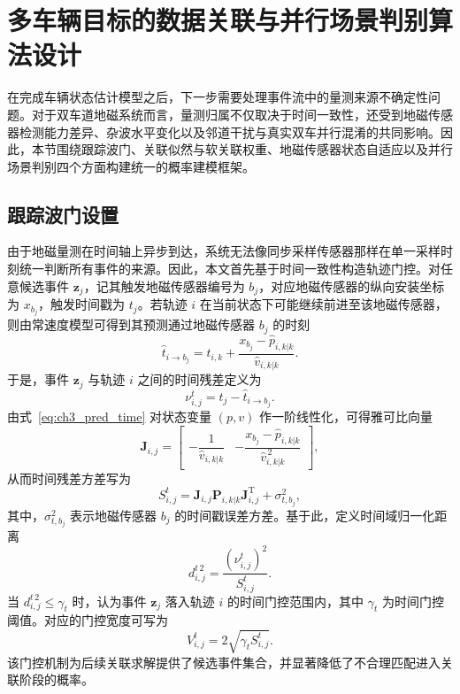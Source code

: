 \documentclass{xdupgthesis}
\begin{document}
\section{多车辆目标的数据关联与并行场景判别算法设计}
\label{sec:ch3_association}

在完成车辆状态估计模型之后，下一步需要处理事件流中的量测来源不确定性问题。对于双车道地磁系统而言，量测归属不仅取决于时间一致性，还受到地磁传感器检测能力差异、杂波水平变化以及邻道干扰与真实双车并行混淆的共同影响。因此，本节围绕跟踪波门、关联似然与软关联权重、地磁传感器状态自适应以及并行场景判别四个方面构建统一的概率建模框架。


\subsection{跟踪波门设置}

由于地磁量测在时间轴上异步到达，系统无法像同步采样传感器那样在单一采样时刻统一判断所有事件的来源。因此，本文首先基于时间一致性构造轨迹门控。对任意候选事件 $\mathbf z_j$，记其触发地磁传感器编号为 $b_j$，对应地磁传感器的纵向安装坐标为 $x_{b_j}$，触发时间戳为 $t_j$。若轨迹 $i$ 在当前状态下可能继续前进至该地磁传感器，则由常速度模型可得到其预测通过地磁传感器 $b_j$ 的时刻
\begin{equation}
	\hat t_{i\rightarrow b_j}
	=
	t_{i,k}+\frac{x_{b_j}-\hat p_{i,k|k}}{\hat v_{i,k|k}}.
	\label{eq:ch3_pred_time}
\end{equation}
于是，事件 $\mathbf z_j$ 与轨迹 $i$ 之间的时间残差定义为
\begin{equation}
	\nu^{t}_{i,j}=t_j-\hat t_{i\rightarrow b_j}.
	\label{eq:ch3_time_residual}
\end{equation}
由式~\eqref{eq:ch3_pred_time} 对状态变量 $(p,v)$ 作一阶线性化，可得雅可比向量
\begin{equation}
	\mathbf J_{i,j}
	=
	\begin{bmatrix}
		-\dfrac{1}{\hat v_{i,k|k}} & -\dfrac{x_{b_j}-\hat p_{i,k|k}}{\hat v_{i,k|k}^{\,2}}
	\end{bmatrix},
	\label{eq:ch3_time_jacobian}
\end{equation}
从而时间残差方差写为
\begin{equation}
	S^{t}_{i,j}=\mathbf J_{i,j}\mathbf P_{i,k|k}\mathbf J_{i,j}^{\mathrm T}+\sigma_{t,b_j}^{2},
	\label{eq:ch3_time_var}
\end{equation}
其中，$\sigma_{t,b_j}^{2}$ 表示地磁传感器 $b_j$ 的时间戳误差方差。基于此，定义时间域归一化距离
\begin{equation}
	d^{t\,2}_{i,j}=\frac{\left(\nu^{t}_{i,j}\right)^2}{S^{t}_{i,j}}.
	\label{eq:ch3_time_maha}
\end{equation}
当 $d^{t\,2}_{i,j}\le \gamma_t$ 时，认为事件 $\mathbf z_j$ 落入轨迹 $i$ 的时间门控范围内，其中 $\gamma_t$ 为时间门控阈值。对应的门控宽度可写为
\begin{equation}
	V^{t}_{i,j}=2\sqrt{\gamma_t S^{t}_{i,j}}.
	\label{eq:ch3_gate_width_time}
\end{equation}
该门控机制为后续关联求解提供了候选事件集合，并显著降低了不合理匹配进入关联阶段的概率。
\end{document}
